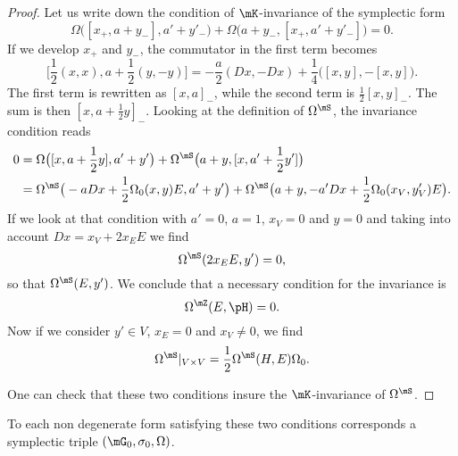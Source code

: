\begin{proof}
	Let us write down the condition of $\mK$-invariance of the symplectic form
	\begin{equation}
		\Omega\big( [x_+,a+y_-],a'+y'_- \big)+\Omega\big( a+y_-,[x_+,a'+y'_-] \big)=0.
	\end{equation}
	If we develop $x_+$ and $y_-$, the commutator in the first term becomes
	\begin{equation}
		\big[ \frac{ 1 }{2}(x,x),a+\frac{ 1 }{2}(y,-y) \big]=-\frac{ a }{2}(Dx,-Dx)+\frac{1}{ 4 }\big( [x,y],-[x,y] \big).
	\end{equation}
	The first term is rewritten as $[x,a]_-$, while the second term is $\frac{ 1 }{2}[x,y]_-$. The sum is then $[x,a+\frac{ 1 }{2}y]_-$. Looking at the definition of $\Omega^{\mS}$, the invariance condition reads
	\begin{equation}
		\begin{aligned}[]
			0 & =\Omega\big( [x,a+\frac{ 1 }{2}y],a'+y' \big)+\Omega^{\mS}\big( a+y,[x,a'+\frac{ 1 }{2}y'] \big)                                     \\
			  & =\Omega^{\mS}\big( -a Dx+\frac{ 1 }{2}\Omega_0(x,y)E,a'+y' \big)+\Omega^{\mS}\big( a+y,-a'Dx+\frac{ 1 }{2}\Omega_0(x_V,y_V')E \big).
		\end{aligned}
	\end{equation}
	If we look at that condition with $a'=0$, $a=1$, $x_V=0$ and $y=0$ and taking into account $Dx=x_V+2x_EE$ we find
	\begin{equation}
		\Omega^{\mS}(2x_EE,y')=0,
	\end{equation}
	so that $\Omega^{\mS}(E,y')$. We conclude that a necessary condition for the invariance is
	\begin{equation}
		\Omega^{\mZ}(E,\pH)=0.
	\end{equation}
	Now if we consider $y'\in V$, $x_E=0$ and $x_V\neq 0$, we find
	\begin{equation}
		\Omega^{\mS}|_{V\times V}=\frac{ 1 }{2}\Omega^{\mS}(H,E)\Omega_0.
	\end{equation}

	One can check that these two conditions insure the $\mK$-invariance of $\Omega^{\mS}$.
\end{proof}

To each non degenerate form satisfying these two conditions corresponds a symplectic triple $(\mG_0,\sigma_0,\Omega)$.

